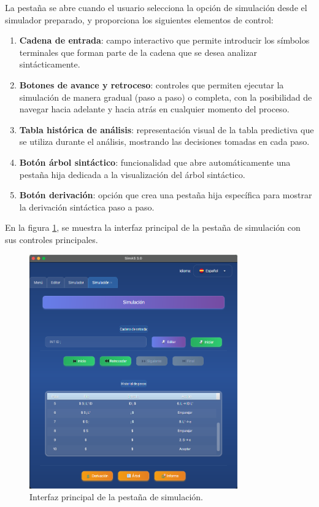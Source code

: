 La pestaña se abre cuando el usuario selecciona la opción de simulación desde el simulador preparado, y proporciona los siguientes elementos de control:

\begin{enumerate}
 \item \textbf{Cadena de entrada}: campo interactivo que permite introducir los símbolos terminales que forman parte de la cadena que se desea analizar sintácticamente.

 \item \textbf{Botones de avance y retroceso}: controles que permiten ejecutar la simulación de manera gradual (paso a paso) o completa, con la posibilidad de navegar hacia adelante y hacia atrás en cualquier momento del proceso.

 \item \textbf{Tabla histórica de análisis}: representación visual de la tabla predictiva que se utiliza durante el análisis, mostrando las decisiones tomadas en cada paso.

 \item \textbf{Botón árbol sintáctico}: funcionalidad que abre automáticamente una pestaña hija dedicada a la visualización del árbol sintáctico.

 \item \textbf{Botón derivación}: opción que crea una pestaña hija específica para mostrar la derivación sintáctica paso a paso.
\end{enumerate}

En la figura \ref{fig:simulacion}, se muestra la interfaz principal de la pestaña de simulación con sus controles principales.

\needspace{8cm}
\begin{figure}[H]
\centering
\includegraphics[width=0.8\textwidth]{figuras2/simulador/simulacion_completa.png}
\caption{Interfaz principal de la pestaña de simulación.}
\label{fig:simulacion}
\end{figure}

